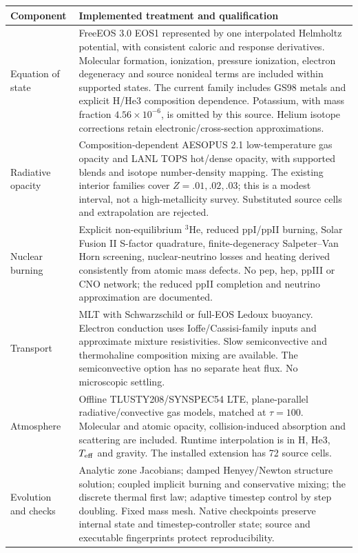 \documentclass[11pt,letterpaper]{article}
\begin{document}
\begin{longtable}{@{}>{\raggedright\arraybackslash}p{}p{}@{}}
\toprule
Component & Implemented treatment and qualification \\
\midrule
\endhead
Equation of state & FreeEOS 3.0 EOS1 represented by one interpolated Helmholtz
potential, with consistent caloric and response derivatives. Molecular formation,
ionization, pressure ionization, electron degeneracy and source nonideal terms
are included within supported states. The current family includes GS98 metals
and explicit H/He3 composition dependence. Potassium, with mass fraction
$4.56\times10^{-6}$, is omitted by this source. Helium isotope corrections retain
electronic/cross-section approximations. \\[5pt]
Radiative opacity & Composition-dependent AESOPUS 2.1 low-temperature gas opacity
and LANL TOPS hot/dense opacity, with supported blends and isotope number-density
mapping. The existing interior families cover $Z=.01,.02,.03$; this is a modest
interval, not a high-metallicity survey. Substituted source cells and extrapolation
are rejected. \\[5pt]
Nuclear burning & Explicit non-equilibrium $^3$He, reduced ppI/ppII burning,
Solar Fusion II S-factor quadrature, finite-degeneracy Salpeter--Van Horn
screening, nuclear-neutrino losses and heating derived consistently from atomic
mass defects. No pep, hep, ppIII or CNO network; the reduced ppII completion and
neutrino approximation are documented. \\[5pt]
Transport & MLT with Schwarzschild or full-EOS Ledoux buoyancy. Electron
conduction uses Ioffe/Cassisi-family inputs and approximate mixture resistivities.
Slow semiconvective and thermohaline composition mixing are available. The
semiconvective option has no separate heat flux. No microscopic settling. \\[5pt]
Atmosphere & Offline TLUSTY208/SYNSPEC54 LTE, plane-parallel radiative/convective
gas models, matched at $\tau=100$. Molecular and atomic opacity, collision-induced
absorption and scattering are included. Runtime interpolation is in H, He3,
$T_{\rm eff}$ and gravity. The installed extension has 72 source cells. \\[5pt]
Evolution and checks & Analytic zone Jacobians; damped Henyey/Newton structure
solution; coupled implicit burning and conservative mixing; the discrete thermal
first law; adaptive timestep control by step doubling. Fixed mass mesh.
Native checkpoints preserve internal state and timestep-controller state;
source and executable fingerprints protect reproducibility. \\
\bottomrule
\end{longtable}
\end{document}
